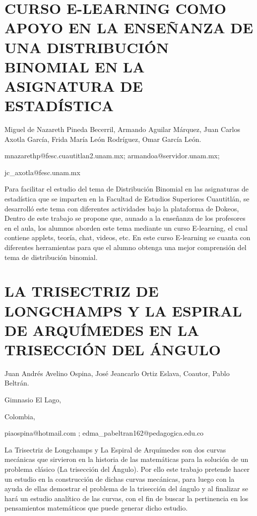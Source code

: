 \section{CURSO E-LEARNING COMO APOYO EN LA ENSEÑANZA DE UNA DISTRIBUCIÓN BINOMIAL
EN LA ASIGNATURA DE ESTADÍSTICA }

\begin{datos}

Miguel de Nazareth Pineda Becerril, Armando Aguilar Márquez, Juan
Carlos Axotla García, Frida María León Rodríguez, Omar García León.

mnazarethp@fesc.cuautitlan2.unam.mx; armandoa@servidor.unam.mx;

jc\_axotla@fesc.unam.mx

\end{datos}

Para facilitar el estudio del tema de Distribución Binomial en las
asignaturas de estadística que se imparten en la Facultad de Estudios
Superiores Cuautitlán, se desarrolló este tema con diferentes actividades
bajo la plataforma de Dokeos, Dentro de este trabajo se propone que,
aunado a la enseñanza de los profesores en el aula, los alumnos aborden
este tema mediante un curso E-learning, el cual contiene applets,
teoría, chat, videos, etc. En este curso E-learning se cuanta con
diferentes herramientas para que el alumno obtenga una mejor comprensión
del tema de distribución binomial.

\setcounter{section}{258}


\section{LA TRISECTRIZ DE LONGCHAMPS Y LA ESPIRAL DE ARQUÍMEDES EN LA TRISECCIÓN
DEL ÁNGULO}

\begin{datos}

Juan Andrés Avelino Ospina, José Jeancarlo Ortiz Eslava, Coautor,
Pablo Beltrán.

Gimnasio El Lago, 

Colombia,

piaospina@hotmail.com ; edma\_pabeltran162@pedagogica.edu.co

\end{datos}

La Trisectriz de Longchamps y La Espiral de Arquímedes son dos curvas
mecánicas que sirvieron en la historia de las matemáticas para la
solución de un problema clásico (La trisección del Ángulo). Por ello
este trabajo pretende hacer un estudio en la construcción de dichas
curvas mecánicas, para luego con la ayuda de ellas demostrar el problema
de la trisección del ángulo y al finalizar se hará un estudio analítico
de las curvas, con el fin de buscar la pertinencia en los pensamientos
matemáticos que puede generar dicho estudio. 


